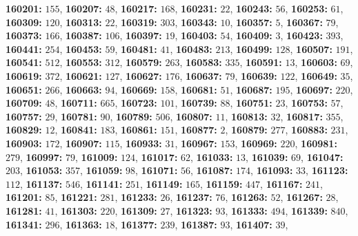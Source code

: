 \textsf{\bfseries 160201:} $155$, \textsf{\bfseries 160207:} $48$, \textsf{\bfseries 160217:} $168$, \textsf{\bfseries 160231:} $22$, \textsf{\bfseries 160243:} $56$, \textsf{\bfseries 160253:} $61$, \textsf{\bfseries 160309:} $120$, \textsf{\bfseries 160313:} $22$, \textsf{\bfseries 160319:} $303$, \textsf{\bfseries 160343:} $10$, \textsf{\bfseries 160357:} $5$, \textsf{\bfseries 160367:} $79$, \textsf{\bfseries 160373:} $166$, \textsf{\bfseries 160387:} $106$, \textsf{\bfseries 160397:} $19$, \textsf{\bfseries 160403:} $54$, \textsf{\bfseries 160409:} $3$, \textsf{\bfseries 160423:} $393$, \textsf{\bfseries 160441:} $254$, \textsf{\bfseries 160453:} $59$, \textsf{\bfseries 160481:} $41$, \textsf{\bfseries 160483:} $213$, \textsf{\bfseries 160499:} $128$, \textsf{\bfseries 160507:} $191$, \textsf{\bfseries 160541:} $512$, \textsf{\bfseries 160553:} $312$, \textsf{\bfseries 160579:} $263$, \textsf{\bfseries 160583:} $335$, \textsf{\bfseries 160591:} $13$, \textsf{\bfseries 160603:} $69$, \textsf{\bfseries 160619:} $372$, \textsf{\bfseries 160621:} $127$, \textsf{\bfseries 160627:} $176$, \textsf{\bfseries 160637:} $79$, \textsf{\bfseries 160639:} $122$, \textsf{\bfseries 160649:} $35$, \textsf{\bfseries 160651:} $266$, \textsf{\bfseries 160663:} $94$, \textsf{\bfseries 160669:} $158$, \textsf{\bfseries 160681:} $51$, \textsf{\bfseries 160687:} $195$, \textsf{\bfseries 160697:} $220$, \textsf{\bfseries 160709:} $48$, \textsf{\bfseries 160711:} $665$, \textsf{\bfseries 160723:} $101$, \textsf{\bfseries 160739:} $88$, \textsf{\bfseries 160751:} $23$, \textsf{\bfseries 160753:} $57$, \textsf{\bfseries 160757:} $29$, \textsf{\bfseries 160781:} $90$, \textsf{\bfseries 160789:} $506$, \textsf{\bfseries 160807:} $11$, \textsf{\bfseries 160813:} $32$, \textsf{\bfseries 160817:} $355$, \textsf{\bfseries 160829:} $12$, \textsf{\bfseries 160841:} $183$, \textsf{\bfseries 160861:} $151$, \textsf{\bfseries 160877:} $2$, \textsf{\bfseries 160879:} $277$, \textsf{\bfseries 160883:} $231$, \textsf{\bfseries 160903:} $172$, \textsf{\bfseries 160907:} $115$, \textsf{\bfseries 160933:} $31$, \textsf{\bfseries 160967:} $153$, \textsf{\bfseries 160969:} $220$, \textsf{\bfseries 160981:} $279$, \textsf{\bfseries 160997:} $79$, \textsf{\bfseries 161009:} $124$, \textsf{\bfseries 161017:} $62$, \textsf{\bfseries 161033:} $13$, \textsf{\bfseries 161039:} $69$, \textsf{\bfseries 161047:} $203$, \textsf{\bfseries 161053:} $357$, \textsf{\bfseries 161059:} $98$, \textsf{\bfseries 161071:} $56$, \textsf{\bfseries 161087:} $174$, \textsf{\bfseries 161093:} $33$, \textsf{\bfseries 161123:} $112$, \textsf{\bfseries 161137:} $546$, \textsf{\bfseries 161141:} $251$, \textsf{\bfseries 161149:} $165$, \textsf{\bfseries 161159:} $447$, \textsf{\bfseries 161167:} $241$, \textsf{\bfseries 161201:} $85$, \textsf{\bfseries 161221:} $281$, \textsf{\bfseries 161233:} $26$, \textsf{\bfseries 161237:} $76$, \textsf{\bfseries 161263:} $52$, \textsf{\bfseries 161267:} $28$, \textsf{\bfseries 161281:} $41$, \textsf{\bfseries 161303:} $220$, \textsf{\bfseries 161309:} $27$, \textsf{\bfseries 161323:} $93$, \textsf{\bfseries 161333:} $494$, \textsf{\bfseries 161339:} $840$, \textsf{\bfseries 161341:} $296$, \textsf{\bfseries 161363:} $18$, \textsf{\bfseries 161377:} $239$, \textsf{\bfseries 161387:} $93$, \textsf{\bfseries 161407:} $39$, 
